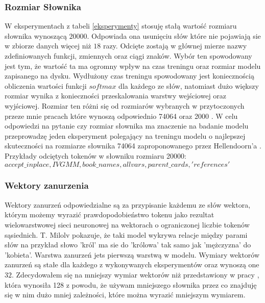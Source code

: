\subsubsection{Rozmiar Słownika}
W eksperymentach z tabeli \ref{eksperymenty} stosuję stałą wartość rozmiaru słownika wynoszącą \begin{math}20000\end{math}. Odpowiada ona usunięciu słów które nie pojawiają sie w 
zbiorze danych więcej niż \begin{math}18\end{math} razy. Odcięte zostają w głównej mierze nazwy zdefiniowanych funkcji, zmiennych oraz ciągi znaków.
Wybór ten spowodowany jest tym, że wartość ta ma ogromny wpływ na czas treningu oraz rozmiar modelu zapisanego na dysku. 
Wydłużony czas treningu spowodowany jest koniecznością obliczenia wartości funkcji \begin{math}softmax\end{math} dla każdego ze słów, natomiast dużo większy rozmiar wynika z konieczności 
przeskalowania warstwy wejściowej oraz wyjściowej. Rozmiar ten różni się od rozmiarów wybranych w przytoczonych przeze mnie pracach które wynoszą odpowiednio 74064 \cite{hellendoorn} oraz 
2000 \cite{contextual_code_completion}. W celu odpowiedzi na pytanie czy rozmiar słownika ma znaczenie na badanie modelu przeprowadzę jeden eksperyment polegający na treningu modelu o najlepszej 
skuteczności na rozmiarze słownika 74064 zaproponowanego przez Hellendoorn'a \cite{hellendoorn}. 
Przykłady odciętych tokenów w słowniku rozmiaru 20000:\\ \begin{math}accept\_inplace, IVGMM, book\_names, allvars, parent\_cards, 'references'\end{math}
\subsubsection{Wektory zanurzenia}
Wektory zanurzeń odpowiedzialne są za przypisanie każdemu ze słów wektora, którym możemy wyrazić prawdopodobieństwo tokenu jako rezultat wielowarstwowej sieci neuronowej na wektorach 
o ograniczonej liczbie tokenów sąsiednich. T. Milolv \cite{word2vec} pokazuje, że taki model wykrywa relacje między parami słów na przykład słowo 'król' ma sie do 'królowa' tak samo 
jak 'mężczyzna' do 'kobieta'. Warstwa zanurzeń jets pierwszą warstwą w modelu.
Wymiary wektorów zanurzeń są stałe dla każdego z wykonywanych eksperymentów oraz wynoszą one \begin{math}32\end{math}. Zdecydowałem się na mniejszy wymiar wektorów niż przedstawiony 
w pracy \cite{hellendoorn}, która wynosiła 128 z powodu, że używam mniejszego słownika przez co znajduję się w nim dużo mniej zależności, które można wyrazić mniejszym wymiarem. 
